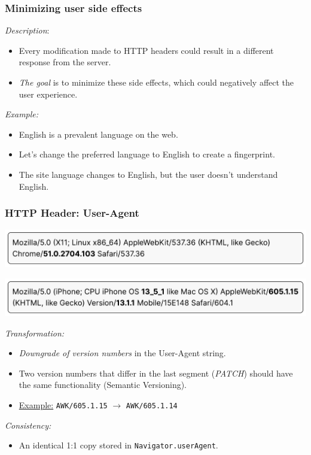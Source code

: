 \begin{frame}
	\frametitle{Minimizing user side effects}
	
	\emph{Description}:
	
	\begin{itemize}
		\item Every modification made to HTTP headers could result in a different response from the server.
		\item \emph{The goal} is to minimize these side effects, which could negatively affect the user experience.
	\end{itemize}
	
	\medskip
	
	\emph{Example:}
	
	\begin{itemize}
		\item English is a prevalent language on the web.
		\item Let's change the preferred language to English to create a  fingerprint.
		\item The site language changes to English, but the user doesn't understand English.
	\end{itemize}
\end{frame}

\begin{frame}
	\frametitle{HTTP Header: User-Agent}
	
	\includegraphics[width=\textwidth]{img/user-agent-1.pdf}

	\medskip
	
	\includegraphics[width=\textwidth]{img/user-agent-2.pdf}
	
	\medskip
	
	\emph{Transformation:}
	
	\begin{itemize}
		\item \emph{Downgrade of version numbers} in the User-Agent string.
		\item Two version numbers that differ in the last segment (\emph{PATCH}) should have the same functionality (Semantic Versioning).
		\item \underline{Example:} \texttt{AWK/605.1.15} $\rightarrow$ \texttt{AWK/605.1.14}
	\end{itemize}
	
	\medskip
	
	\emph{Consistency:}
	
	\begin{itemize}
		\item An identical 1:1 copy stored in \texttt{Navigator.userAgent}.
	\end{itemize}
\end{frame}

